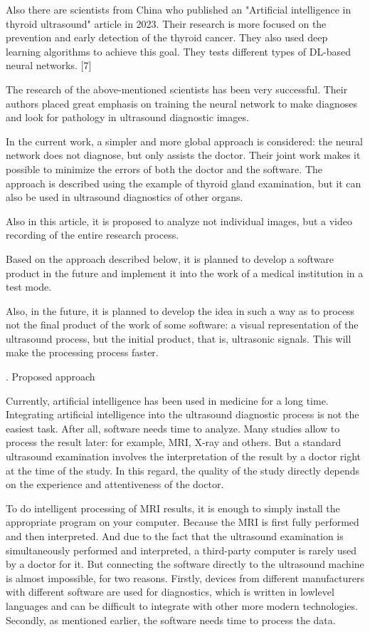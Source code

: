 \documentclass[a4paper,10pt,twocolumn]{article}
\newcommand{\RomanNumeralCaps}[1]
    {\MakeUppercase{\romannumeral #1}}
\begin{document}
Also there are scientists from China who published an
"Artificial intelligence in thyroid ultrasound" article in
2023. Their research is more focused on the prevention
and early detection of the thyroid cancer. They also used
deep learning algorithms to achieve this goal. They tests
different types of DL-based neural networks. [7]

The research of the above-mentioned scientists has
been very successful. Their authors placed great emphasis on training the neural network to make diagnoses and
look for pathology in ultrasound diagnostic images.

In the current work, a simpler and more global
approach is considered: the neural network does not
diagnose, but only assists the doctor. Their joint work
makes it possible to minimize the errors of both the
doctor and the software. The approach is described using
the example of thyroid gland examination, but it can also
be used in ultrasound diagnostics of other organs.

Also in this article, it is proposed to analyze not
individual images, but a video recording of the entire
research process.

Based on the approach described below, it is planned
to develop a software product in the future and implement
it into the work of a medical institution in a test mode.

Also, in the future, it is planned to develop the idea
in such a way as to process not the final product of
the work of some software: a visual representation of
the ultrasound process, but the initial product, that is,
ultrasonic signals. This will make the processing process
faster.
\begin{center}
    \RomanNumeralCaps{4}. Proposed approach
    \vspace{-3 mm}
\end{center}

Currently, artificial intelligence has been used in
medicine for a long time. Integrating artificial intelligence into the ultrasound diagnostic process is not the
easiest task. After all, software needs time to analyze.
Many studies allow to process the result later: for example, MRI, X-ray and others. But a standard ultrasound
examination involves the interpretation of the result by a
doctor right at the time of the study. In this regard, the
quality of the study directly depends on the experience
and attentiveness of the doctor.

To do intelligent processing of MRI results, it is
enough to simply install the appropriate program on your
computer. Because the MRI is first fully performed and
then interpreted. And due to the fact that the ultrasound
examination is simultaneously performed and interpreted,
a third-party computer is rarely used by a doctor for it.
But connecting the software directly to the ultrasound
machine is almost impossible, for two reasons. Firstly,
devices from different manufacturers with different software are used for diagnostics, which is written in lowlevel languages and can be difficult to integrate with
other more modern technologies. Secondly, as mentioned
earlier, the software needs time to process the data.
\end{document}
